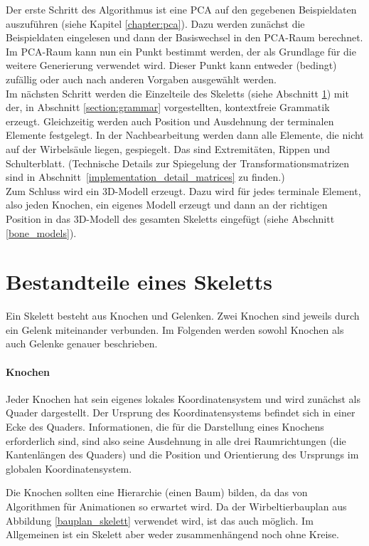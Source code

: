 Der erste Schritt des Algorithmus ist eine PCA auf den gegebenen Beispieldaten auszuführen (siehe Kapitel \ref{chapter:pca}). Dazu werden zunächst die Beispieldaten eingelesen und dann der Basiswechsel in den PCA-Raum berechnet. Im PCA-Raum kann nun ein Punkt bestimmt werden, der als Grundlage für die weitere Generierung verwendet wird. Dieser Punkt kann entweder (bedingt) zufällig oder auch nach anderen Vorgaben ausgewählt werden.\\
Im nächsten Schritt werden die Einzelteile des Skeletts (siehe Abschnitt \ref{skeleton_parts}) mit der, in Abschnitt \ref{section:grammar} vorgestellten, kontextfreie Grammatik erzeugt. Gleichzeitig werden auch Position und Ausdehnung der terminalen Elemente festgelegt.
In der Nachbearbeitung werden dann alle Elemente, die nicht auf der Wirbelsäule liegen, gespiegelt. Das sind Extremitäten, Rippen und Schulterblatt. (Technische Details zur Spiegelung der Transformationsmatrizen sind in \mbox{Abschnitt \ref{implementation_detail_matrices}} zu finden.)\\
Zum Schluss wird ein 3D-Modell erzeugt. Dazu wird für jedes terminale Element, also jeden Knochen, ein eigenes Modell erzeugt und dann an der richtigen Position in das 3D-Modell des gesamten Skeletts eingefügt (siehe Abschnitt \ref{bone_models}). 


\section{Bestandteile eines Skeletts}
\label{skeleton_parts}

Ein Skelett besteht aus Knochen und Gelenken. Zwei Knochen sind jeweils durch ein Gelenk miteinander verbunden. Im Folgenden werden sowohl Knochen als auch Gelenke genauer beschrieben.

\paragraph{Knochen}
Jeder Knochen hat sein eigenes lokales Koordinatensystem und wird zunächst als Quader dargestellt. Der Ursprung des Koordinatensystems befindet sich in einer Ecke des Quaders.
Informationen, die für die Darstellung eines Knochens erforderlich sind, sind also
seine Ausdehnung in alle drei Raumrichtungen (die Kantenlängen des Quaders) und die Position und Orientierung des Ursprungs im globalen Koordinatensystem.

Die Knochen sollten eine Hierarchie (einen Baum) bilden, da das von Algorithmen für Animationen so erwartet wird.  Da der Wirbeltierbauplan aus Abbildung \ref{bauplan_skelett} verwendet wird, ist das auch möglich. Im Allgemeinen ist ein Skelett aber weder zusammenhängend noch ohne Kreise.

